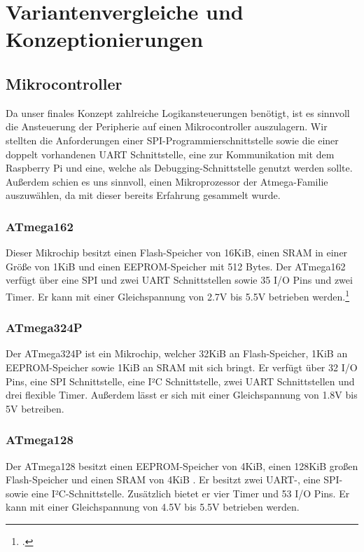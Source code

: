 \section{Variantenvergleiche und Konzeptionierungen}

\subsection{Mikrocontroller}
Da unser finales Konzept zahlreiche Logikansteuerungen benötigt, ist es sinnvoll die Ansteuerung der Peripherie auf einen Mikrocontroller auszulagern.
Wir stellten die Anforderungen einer \acs{SPI}-Programmierschnittstelle sowie die einer doppelt vorhandenen UART Schnittstelle, eine zur Kommunikation mit dem Raspberry Pi und eine, welche als Debugging-Schnittstelle genutzt werden sollte.
Außerdem schien es uns sinnvoll, einen Mikroprozessor der Atmega-Familie auszuwählen, da mit dieser bereits Erfahrung gesammelt wurde.

\subsubsection{ATmega162}
Dieser Mikrochip besitzt einen Flash-Speicher von 16KiB, einen \acs{SRAM} in einer Größe von 1KiB und einen \acs{EEPROM}-Speicher mit 512 Bytes.
Der ATmega162 verfügt über eine SPI und zwei UART Schnittstellen sowie 35 \acs{I/O} Pins und zwei Timer.
Er kann mit einer Gleichspannung von 2.7V bis 5.5V betrieben werden.\footcite{AVR-Typen}

\subsubsection{ATmega324P}
Der ATmega324P ist ein Mikrochip, welcher 32KiB an Flash-Speicher, 1KiB an EEPROM-Speicher sowie 1KiB an SRAM mit sich bringt.
Er verfügt über 32 I/O Pins, eine SPI Schnittstelle, eine I²C Schnittstelle, zwei UART Schnittstellen und drei flexible Timer.
Außerdem lässt er sich mit einer Gleichspannung von 1.8V bis 5V betreiben. \footnotemark[1]

\subsubsection{ATmega128}
Der ATmega128 besitzt einen EEPROM-Speicher von 4KiB, einen 128KiB großen Flash-Speicher und einen SRAM von 4KiB .
Er besitzt zwei UART-, eine SPI- sowie eine I²C-Schnittstelle.
Zusätzlich bietet er vier Timer und 53 I/O Pins.
Er kann mit einer Gleichspannung von 4.5V bis 5.5V betrieben werden. \footnotemark[1]

